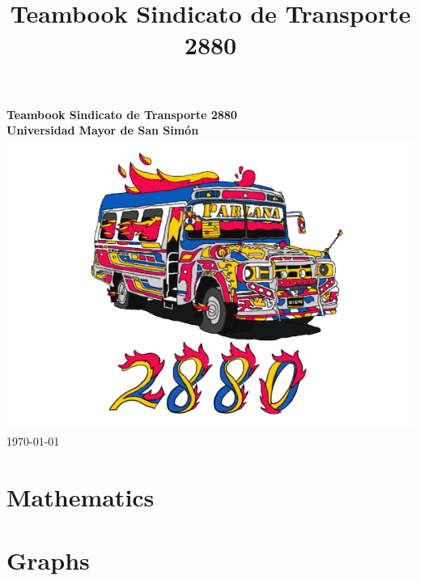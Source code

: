 \documentclass[landscape,twocolumn, 7pt, letterpaper]{book}
\begin{document}
\title{Teambook Sindicato de Transporte 2880}
\begin{titlepage}
  \centering
  \vfill
  {\bfseries\Huge
  Teambook Sindicato de Transporte 2880\\
  \vspace{2cm}
  Universidad Mayor de San Simón\\
  }    
  \vfill
  \includegraphics[width=14cm]{../Figures/LogoSdT2880.png} %
  \vfill
  \LARGE{\today}
\end{titlepage}

\tableofcontents

\chapter{Mathematics}


\chapter{Graphs}

\end{document}
